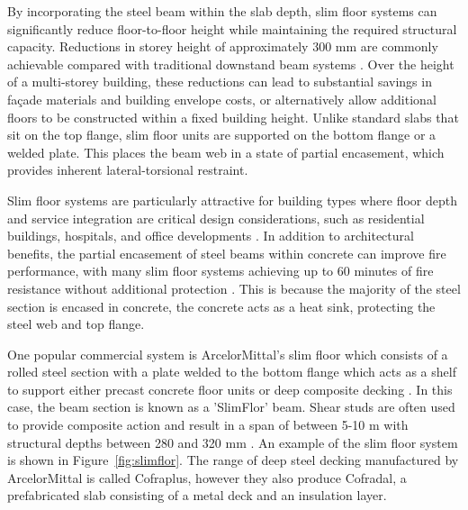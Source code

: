 By incorporating the steel beam within the slab depth, slim floor systems can significantly reduce floor-to-floor height while maintaining the required structural capacity. Reductions in storey height of approximately 300 mm are commonly achievable compared with traditional downstand beam systems \citep{RefWorks:lawson2015slimfloor}. Over the height of a multi-storey building, these reductions can lead to substantial savings in façade materials and building envelope costs, or alternatively allow additional floors to be constructed within a fixed building height. Unlike standard slabs that sit on the top flange, slim floor units are supported on the bottom flange or a welded plate. This places the beam web in a state of partial encasement, which provides inherent lateral-torsional restraint.

Slim floor systems are particularly attractive for building types where floor depth and service integration are critical design considerations, such as residential buildings, hospitals, and office developments \citep{RefWorks:lawson2015slimfloor}. In addition to architectural benefits, the partial encasement of steel beams within concrete can improve fire performance, with many slim floor systems achieving up to 60 minutes of fire resistance without additional protection \citep{RefWorks:lawson1999slimflor}. This is because the majority of the steel section is encased in concrete, the concrete acts as a heat sink, protecting the steel web and top flange.

One popular commercial system is ArcelorMittal's slim floor which consists of a rolled steel section with a plate welded to the bottom flange which acts as a shelf to support either precast concrete floor units or deep composite decking \citep{RefWorks:arcelormittal2017slimfloor}. In this case, the beam section is known as a 'SlimFlor' beam. Shear studs are often used to provide composite action and result in a span of between 5-10 m with structural depths between 280 and 320 mm \citep{RefWorks:lawson1999slimflor}.  An example of the slim floor system is shown in Figure~\ref{fig:slimflor}. The range of deep steel decking manufactured by ArcelorMittal is called Cofraplus, however they also produce Cofradal, a prefabricated slab consisting of a metal deck and an insulation layer.

